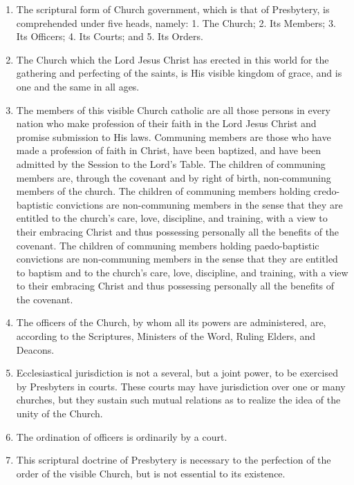 \documentclass[
]{book}
\providecommand{\tightlist}{%
  \setlength{\itemsep}{0pt}\setlength{\parskip}{0pt}}
\begin{document}
\begin{enumerate}
\def\labelenumi{\arabic{enumi}.}
\tightlist
\item
  \protect\hypertarget{1}{\href{}{}}The scriptural form of Church government, which is that of Presbytery, is comprehended under five heads, namely: 1. The Church; 2. Its Members; 3. Its Officers; 4. Its Courts; and 5. Its Orders.
\item
  The Church which the Lord Jesus Christ has erected in this world for the gathering and perfecting of the saints, is His visible kingdom of grace, and is one and the same in all ages.
\item
  \protect\hypertarget{1.3}{\href{}{}}The members of this visible Church catholic are all those persons in every nation who make profession of their faith in the Lord Jesus Christ and promise submission to His laws. Communing members are those who have made a profession of faith in Christ, have been baptized, and have been admitted by the Session to the Lord's Table. The children of communing members are, through the covenant and by right of birth, non-communing members of the church. The children of communing members holding credo-baptistic convictions are non-communing members in the sense that they are entitled to the church's care, love, discipline, and training, with a view to their embracing Christ and thus possessing personally all the benefits of the covenant. The children of communing members holding paedo-baptistic convictions are non-communing members in the sense that they are entitled to baptism and to the church's care, love, discipline, and training, with a view to their embracing Christ and thus possessing personally all the benefits of the covenant.
\item
  The officers of the Church, by whom all its powers are administered, are, according to the Scriptures, Ministers of the Word, Ruling Elders, and Deacons.
\item
  Ecclesiastical jurisdiction is not a several, but a joint power, to be exercised by Presbyters in courts. These courts may have jurisdiction over one or many churches, but they sustain such mutual relations as to realize the idea of the unity of the Church.
\item
  The ordination of officers is ordinarily by a court.
\item
  This scriptural doctrine of Presbytery is necessary to the perfection of the order of the visible Church, but is not essential to its existence.
\end{enumerate}
\end{document}
